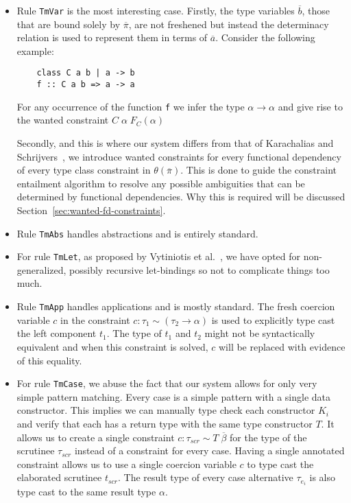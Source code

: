 \begin{itemize}

  \item Rule \texttt{TmVar} is the most interesting case. Firstly, the type variables
$\overline{b}$, those that are bound solely by $\overline{\pi}$, are not
freshened but instead the determinacy relation is used to represent them in
terms of $\overline{a}$. Consider the following example:
\begin{verbatim}
    class C a b | a -> b
    f :: C a b => a -> a
\end{verbatim}
For any occurrence of the function \texttt{f} we infer the type $\alpha
\rightarrow \alpha$ and give rise to the wanted constraint $C \; \alpha \;
F_C(\alpha)$

Secondly, and this is where our system differs from that of Karachalias and
Schrijvers~\cite{Karachalias:2017:EFD:3156695.3122966}, we introduce wanted constraints
for every functional dependency of every type class constraint in
$\theta(\overline{\pi})$. This is done to guide the constraint entailment
algorithm to resolve any possible ambiguities that can be determined by
functional dependencies. Why this is required will be discussed
Section~\ref{sec:wanted-fd-constraints}.

\item Rule \texttt{TmAbs} handles abstractions and is entirely standard.

\item For rule \texttt{TmLet}, as proposed by Vytiniotis et
al.~\cite{vytiniotis}, we have opted for non-generalized, possibly recursive
let-bindings so not to complicate things too much.

\item Rule \texttt{TmApp} handles applications and is mostly standard. The fresh
coercion variable $c$ in the constraint $c : \tau_1 \sim (\tau_2 \rightarrow
\alpha)$ is used to explicitly type cast the left component $t_1$. The type of
$t_1$ and $t_2$ might not be syntactically equivalent and when this constraint is
solved, $c$ will be replaced with evidence of this equality.

\item For rule \texttt{TmCase}, we abuse the fact that our system allows for only very
simple pattern matching. Every case is a simple pattern with a single data
constructor. This implies we can manually type check each constructor $K_i$ and
verify that each has a return type with the same type constructor $T$. It allows
us to create a single constraint $c : \tau_{scr} \sim T \; \overline{\beta}$ for
the type of the scrutinee $\tau_{scr}$ instead of a constraint for every case.
Having a single annotated constraint allows us to use a single coercion variable
$c$ to type cast the elaborated scrutinee $t_{scr}$. The result type of every case
alternative $\tau_{e_i}$ is also type cast to the same result type $\alpha$.

\end{itemize}
